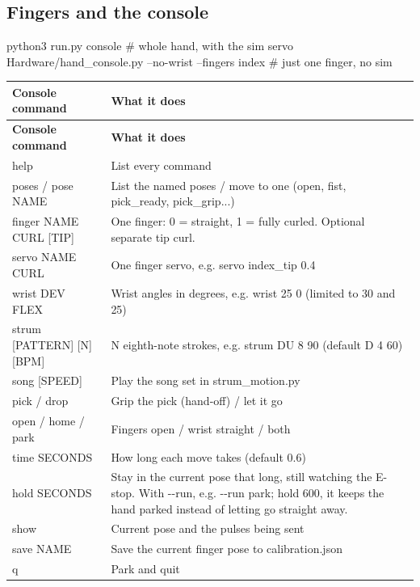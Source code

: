 \documentclass[11pt,letterpaper]{article}
\newcommand{\code}[1]{\textcolor{codeblue}{\ttfamily\smaller\relax #1}}
\begin{document}
\subsection{Fingers and the console}
\begin{codeblock}
python3 run.py console                                     # whole hand, with the sim
servo Hardware/hand_console.py --no-wrist --fingers index  # just one finger, no sim
\end{codeblock}
{\small
\begin{longtable}{|>{\raggedright\arraybackslash}p{}|>{\raggedright\arraybackslash}p{}|}
\hline
\rowcolor{tblhead}\textbf{Console command} & \textbf{What it does} \\ \hline
\endfirsthead
\hline
\rowcolor{tblhead}\textbf{Console command} & \textbf{What it does} \\ \hline
\endhead
\code{help} & List every command \\ \hline
\code{poses} / \code{pose NAME} & List the named poses / move to one (\code{open}, \code{fist}, \code{pick\_\allowbreak{}ready}, \code{pick\_\allowbreak{}grip}...) \\ \hline
\code{finger NAME CURL [TIP]} & One finger: 0 = straight, 1 = fully curled. Optional separate tip curl. \\ \hline
\code{servo NAME CURL} & One finger servo, e.g. \code{servo index\_\allowbreak{}tip 0.4} \\ \hline
\code{wrist DEV FLEX} & Wrist angles in degrees, e.g. \code{wrist 25 0} (limited to \textpm{}30 and \textpm{}25) \\ \hline
\code{strum [PATTERN] [N] [BPM]} & N eighth-note strokes, e.g. \code{strum DU 8 90} (default \code{D 4 60}) \\ \hline
\code{song [SPEED]} & Play the song set in \code{strum\_\allowbreak{}motion.py} \\ \hline
\code{pick} / \code{drop} & Grip the pick (hand-off) / let it go \\ \hline
\code{open} / \code{home} / \code{park} & Fingers open / wrist straight / both \\ \hline
\code{time SECONDS} & How long each move takes (default 0.6) \\ \hline
\code{hold SECONDS} & Stay in the current pose that long, still watching the E-stop. With \code{-{}-{}run}, e.g. \code{-{}-{}run \textquotedbl{}park; hold 600\textquotedbl{}}, it keeps the hand parked instead of letting go straight away. \\ \hline
\code{show} & Current pose and the pulses being sent \\ \hline
\code{save NAME} & Save the current finger pose to \code{calibration.json} \\ \hline
\code{q} & Park and quit \\ \hline
\end{longtable}}
\end{document}
